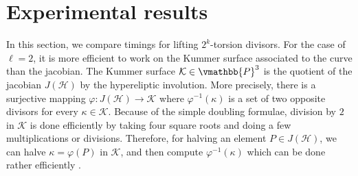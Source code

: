 \section{Experimental results}

In this section, we compare timings for lifting $2^k$-torsion divisors. For the case of $\ell = 2$, 
it is more efficient to work on the Kummer surface associated to the curve than the jacobian. The 
Kummer surface $\mathcal{K} \in \vmathbb{P}^3$ is the quotient of the jacobian $J(\mathcal{H})$ by 
the hypereliptic involution. More precisely, there is a surjective mapping $\varphi: J(\mathcal{H}) 
\rightarrow \mathcal{K}$ where $\varphi^{-1}(\kappa)$ is a set of two opposite divisors for every 
$\kappa \in \mathcal{K}$. Because of the simple doubling formulae, division by $2$ in $\mathcal{K}$ 
is done efficiently by taking four square roots and doing a few multiplications or divisions. 
Therefore, for halving an element $P \in J(\mathcal{H})$, we can halve $\kappa = \varphi(P)$ in 
$\mathcal{K}$, and then compute $\varphi^{-1}(\kappa)$ which can be done rather efficiently 
\cite{Gaudry2007}. 

